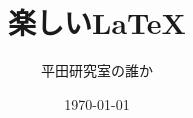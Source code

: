 
\usepackage{zemi2kai}

\usepackage{amsmath}
\usepackage{amsfonts}
\usepackage{theorem}
\newtheorem{defi}{定義}[section]

\usepackage{graphicx}

\usepackage{tikz}

\usepackage{url}

\title{楽しい\LaTeX}
\author{平田研究室の誰か}
\date{\today}


\maketitle

